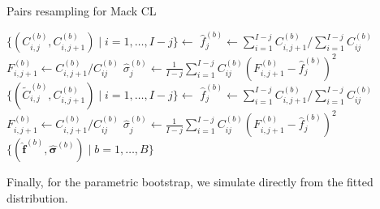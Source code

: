 \documentclass[a4paper]{book}
\begin{document}
\begin{algorithm}
  \caption{Pairs resampling for Mack CL}
  \label{alg:pairs-mack}
  \begin{algorithmic}
          \vspace{5pt}
          \State $\{ (C^{(b)}_{i, j}, C^{(b)}_{i, j + 1}) \mid i = 1, \dots, I - j \} \gets$ 
          \vspace{5pt}
          \State $\widehat{f}^{(b)}_j \gets \sum_{i = 1}^{I - j} C^{(b)}_{i, j + 1} / \sum_{i = 1}^{I - j} C^{(b)}_{ij}$
          \vspace{5pt}
            \State $\displaystyle F^{(b)}_{i, j + 1} \gets C^{(b)}_{i, j + 1} / C^{(b)}_{ij}$
            \vspace{5pt}
          \EndFor
          \State $\displaystyle \widehat{\sigma}^{(b)}_j \gets \frac{1}{I-j}\sum_{i = 1}^{I-j} C^{(b)}_{ij}\left( F^{(b)}_{i, j + 1} - \widehat{f}^{(b)}_j \right)^2$
        \EndFor
      \Else
          \vspace{5pt}
          \State $\{ (\widetilde{C}^{(b)}_{i, j}, C^{(b)}_{i, j + 1}) \mid i = 1, \dots, I - j \} \gets$ 
          \vspace{5pt}
          \State $\widehat{f}^{(b)}_j \gets \sum_{i = 1}^{I - j} C^{(b)}_{i, j + 1} / \sum_{i = 1}^{I - j} C^{(b)}_{ij}$
          \vspace{5pt}
            \State $\displaystyle F^{(b)}_{i, j + 1} \gets C^{(b)}_{i, j + 1} / C^{(b)}_{ij}$
            \vspace{5pt}
          \EndFor
          \State $\displaystyle \widehat{\sigma}^{(b)}_j \gets \frac{1}{I-j}\sum_{i = 1}^{I-j} C^{(b)}_{ij}\left( F^{(b)}_{i, j + 1} - \widehat{f}^{(b)}_j \right)^2$
        \EndFor
      \EndIf
    \EndFor
    \State \Return $\{ (\widehat{\bm{f}}^{(b)}, \widehat{\bm{\sigma}}^{(b)}) \mid b = 1, \dots, B \}$
  \end{algorithmic}
\end{algorithm}

Finally, for the parametric bootstrap, we simulate directly from the fitted distribution.
\end{document}
